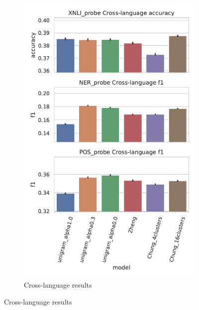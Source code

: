 \begin{figure}
\begin{subfigure}{.5\textwidth}
    \end{subfigure}%
    \begin{subfigure}{.5\textwidth}
      \centering
      \includegraphics[width=\linewidth]{figures/probe_overall_crosslanguage.pdf}
      \caption{Cross-language results}
      \label{fig:probe_overall_crosslanguage}
    \end{subfigure}

\end{figure}
